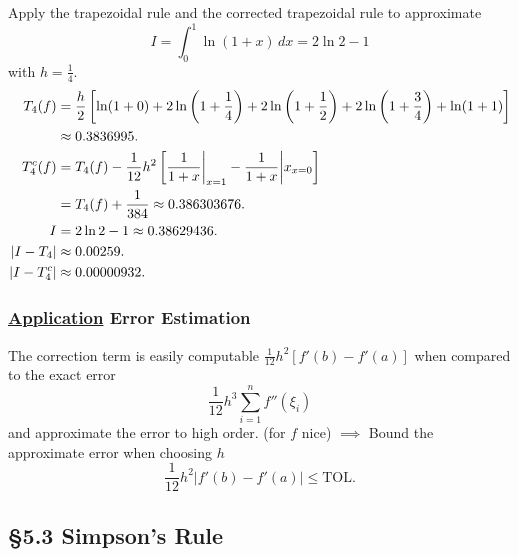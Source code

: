 \documentclass[]{article}
\begin{document}
\begin{example}
	Apply the trapezoidal rule and the corrected trapezoidal rule to approximate $$I=\int_0^1 \ln(1+x)\,dx = 2\ln2-1$$ with $h=\frac14$.
	\begin{align*}
		T_4(f) &= \frac h2\left[\ln(1+0)+2\ln\left(1+\frac14\right)+2\ln\left(1+\frac12\right)+2\ln\left(1+\frac34\right)+\ln(1+1)\right] \\
			   &\approx 0.3836995. \\
		T_4^c(f) &= T_4(f)-\frac1{12}h^2\left[\frac1{1+x}\bigg|_{x=1}-\frac1{1+x}\bigg|x_{x=0}\right] \\
				 &= T_4(f) + \frac1{384} \approx 0.386303676. \\
		I &= 2\ln2-1 \approx 0.38629436. \\
		|I-T_4| &\approx 0.00259. \\
		|I-T_4^c| &\approx 0.00000932.
	\end{align*}
\end{example}

\subsubsection*{\ul{Application} Error Estimation}

The correction term is easily computable $\frac1{12}h^2[f'(b)-f'(a)]$ when compared to the exact error $$\frac1{12}h^3\sum_{i=1}^nf''(\xi_i)$$ and approximate the error to high order. (for $f$ nice)
$\implies$ Bound the approximate error when choosing $h$ $$\frac1{12}h^2|f'(b)-f'(a)|\leq\text{TOL}.$$

\subsection*{\S5.3 Simpson's Rule}
\end{document}
